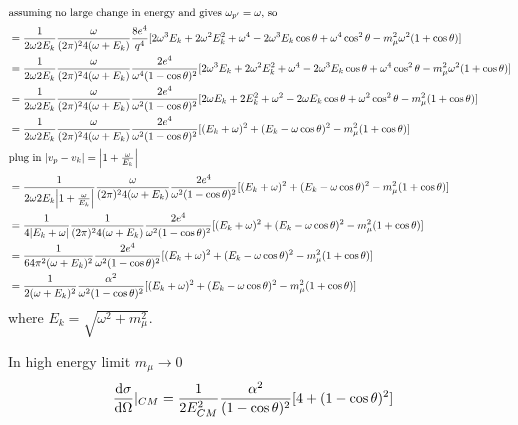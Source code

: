 \documentclass{article}
\newcommand{\s}{\sigma}
\begin{document}
\begin{align*}
  \intertext{assuming no large change in energy and gives $\omega_{p'}=\omega$, so}
  &=\frac{1}{2\omega2E_{k}}\frac{\omega}{(2\pi)^24(\omega+E_k)}\frac{8e^4}{q^4}[2\omega^3 E_k+2\omega^2 E_k^2+\omega^4-2\omega^3 E_k\cos\theta+\omega^4\cos^2\theta-m_{\mu}^2\omega^2(1+\cos\theta)]\\
  &=\frac{1}{2\omega2E_{k}}\frac{\omega}{(2\pi)^24(\omega+E_k)}\frac{2e^4}{\omega^4(1-\cos\theta)^2}[2\omega^3 E_k+2\omega^2 E_k^2+\omega^4-2\omega^3 E_k\cos\theta+\omega^4\cos^2\theta-m_{\mu}^2\omega^2(1+\cos\theta)]\\
  &=\frac{1}{2\omega2E_{k}}\frac{\omega}{(2\pi)^24(\omega+E_k)}\frac{2e^4}{\omega^2(1-\cos\theta)^2}[2\omega E_k+2 E_k^2+\omega^2-2\omega E_k\cos\theta+\omega^2\cos^2\theta-m_{\mu}^2(1+\cos\theta)]\\
  &=\frac{1}{2\omega2E_{k}}\frac{\omega}{(2\pi)^24(\omega+E_k)}\frac{2e^4}{\omega^2(1-\cos\theta)^2}[(E_k+\omega)^2+(E_k-\omega\cos\theta)^2-m_{\mu}^2(1+\cos\theta)]\\
  \intertext{plug in $\abs{v_p-v_{k}}=\abs{1+\frac{\omega}{E_k}}$}
  &=\frac{1}{2\omega2E_{k}\abs{1+\frac{\omega}{E_k}}}\frac{\omega}{(2\pi)^24(\omega+E_k)}\frac{2e^4}{\omega^2(1-\cos\theta)^2}[(E_k+\omega)^2+(E_k-\omega\cos\theta)^2-m_{\mu}^2(1+\cos\theta)]\\
  &=\frac{1}{4\abs{E_k+\omega }}\frac{1}{(2\pi)^24(\omega+E_k)}\frac{2e^4}{\omega^2(1-\cos\theta)^2}[(E_k+\omega)^2+(E_k-\omega\cos\theta)^2-m_{\mu}^2(1+\cos\theta)]\\
  &=\frac{1}{64\pi^2(\omega+E_k)^2}\frac{2e^4}{\omega^2(1-\cos\theta)^2}[(E_k+\omega)^2+(E_k-\omega\cos\theta)^2-m_{\mu}^2(1+\cos\theta)]\\  &=\frac{1}{2(\omega+E_k)^2}\frac{\alpha^2}{\omega^2(1-\cos\theta)^2}[(E_k+\omega)^2+(E_k-\omega\cos\theta)^2-m_{\mu}^2(1+\cos\theta)]
\end{align*}
where $E_k=\sqrt{\omega^2+m_{\mu}^2}$.

In high energy limit $m_{\mu}\rightarrow 0$
\begin{align*}
  \dv{\s}{\Omega}|_{CM}&=\frac{1}{2E_{CM}^2}\frac{\alpha^2}{(1-\cos\theta)^2}[4+(1-\cos\theta)^2]
\end{align*}

\end{document}
